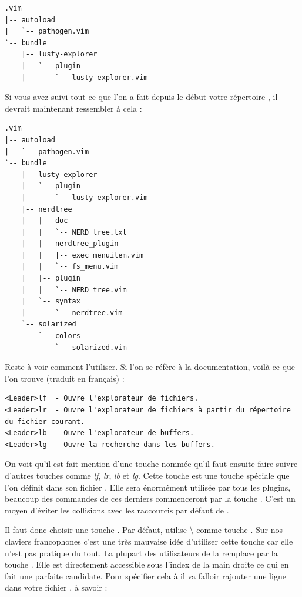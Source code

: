 \begin{verbatim}
.vim
|-- autoload
|   `-- pathogen.vim
`-- bundle
    |-- lusty-explorer
    |   `-- plugin
    |       `-- lusty-explorer.vim
\end{verbatim}

Si vous avez suivi tout ce que l'on a fait depuis le début votre répertoire \dotvim, il devrait maintenant ressembler à cela :

\begin{verbatim}
.vim
|-- autoload
|   `-- pathogen.vim
`-- bundle
    |-- lusty-explorer
    |   `-- plugin
    |       `-- lusty-explorer.vim
    |-- nerdtree
    |   |-- doc
    |   |   `-- NERD_tree.txt
    |   |-- nerdtree_plugin
    |   |   |-- exec_menuitem.vim
    |   |   `-- fs_menu.vim
    |   |-- plugin
    |   |   `-- NERD_tree.vim
    |   `-- syntax
    |       `-- nerdtree.vim
    `-- solarized
        `-- colors
            `-- solarized.vim
\end{verbatim}

Reste à voir comment l'utiliser. Si l'on se réfère à la documentation, voilà ce que l'on trouve (traduit en français) :

\begin{verbatim}
<Leader>lf  - Ouvre l'explorateur de fichiers.
<Leader>lr  - Ouvre l'explorateur de fichiers à partir du répertoire du fichier courant.
<Leader>lb  - Ouvre l'explorateur de buffers.
<Leader>lg  - Ouvre la recherche dans les buffers.
\end{verbatim}

On voit qu'il est fait mention d'une touche nommée \tleader qu'il faut ensuite faire suivre d'autres touches comme \emph{lf}, \emph{lr}, \emph{lb} et \emph{lg}. Cette touche \tleader\xspace est une touche spéciale que l'on définit dans son fichier \vimrc. Elle sera énormément utilisée par tous les plugins, beaucoup des commandes de ces derniers commenceront par la touche \tleader. C'est un moyen d'éviter les collisions avec les raccourcis par défaut de \vim.

Il faut donc choisir une touche \tleader. Par défaut, \vim utilise \textbackslash\xspace comme touche \tleader. Sur nos claviers francophones c'est une très mauvaise idée d'utiliser cette touche car elle n'est pas pratique du tout. La plupart des utilisateurs de \vim la remplace par la touche \tcomma. Elle est directement accessible sous l'index de la main droite ce qui en fait une parfaite candidate. Pour spécifier cela à \vim il va falloir rajouter une ligne dans votre fichier \vimrc, à savoir :

